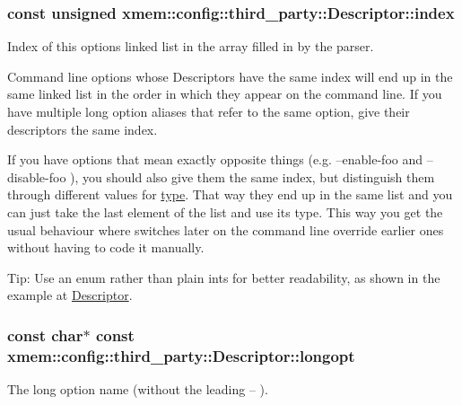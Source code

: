\subsubsection[{index}]{\setlength{\rightskip}{0pt plus 5cm}const unsigned xmem\+::config\+::third\+\_\+party\+::\+Descriptor\+::index}\label{structxmem_1_1config_1_1third__party_1_1_descriptor_aacf3d44f35c61f22be65da078f60734b}


Index of this option\textquotesingle{}s linked list in the array filled in by the parser. 

Command line options whose Descriptors have the same index will end up in the same linked list in the order in which they appear on the command line. If you have multiple long option aliases that refer to the same option, give their descriptors the same {\ttfamily index}.

If you have options that mean exactly opposite things (e.\+g. {\ttfamily --enable-\/foo} and {\ttfamily --disable-\/foo} ), you should also give them the same {\ttfamily index}, but distinguish them through different values for \hyperlink{structxmem_1_1config_1_1third__party_1_1_descriptor_a4b9e9a5c9b08ef575ea4f603c54bff63}{type}. That way they end up in the same list and you can just take the last element of the list and use its type. This way you get the usual behaviour where switches later on the command line override earlier ones without having to code it manually.

\begin{DoxyParagraph}{Tip\+:}
Use an enum rather than plain ints for better readability, as shown in the example at \hyperlink{structxmem_1_1config_1_1third__party_1_1_descriptor}{Descriptor}. 
\end{DoxyParagraph}
\hypertarget{structxmem_1_1config_1_1third__party_1_1_descriptor_a7246a4bfc669f68bb406dece398be7bb}{}
\subsubsection[{longopt}]{\setlength{\rightskip}{0pt plus 5cm}const char$\ast$ const xmem\+::config\+::third\+\_\+party\+::\+Descriptor\+::longopt}\label{structxmem_1_1config_1_1third__party_1_1_descriptor_a7246a4bfc669f68bb406dece398be7bb}


The long option name (without the leading {\ttfamily --} ). 

